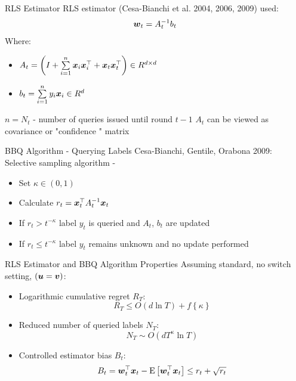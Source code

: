 \documentclass{beamer}
\begin{document}
\begin{frame}{RLS Estimator}
RLS estimator (Cesa-Bianchi et al. 2004, 2006, 2009) used:
\begin{equation*}
{\boldsymbol{w}}_{t}=A_{t}^{-1}b_t
\label{RLS2}
\end{equation*}
Where:\newline
\begin{itemize} 
\item $A_t=\left(I+\sum\limits_{i=1}^{n}{\boldsymbol{x}}_{i} {{\boldsymbol{x}}}^{\top}_{i}+ {\boldsymbol{x}}_{t} {{\boldsymbol{x}}}^{\top}_{t}\right)\in R^{d\times d}$\newline
\item $b_t=\sum\limits_{i=1}^{n}y_i{\boldsymbol{x}}_{i}\in R^d$ \newline
\end{itemize}
 $n=N_t$ - number of queries issued until round $t-1$\newline\newline
$A_t$ can be viewed as covariance or "confidence " matrix
\end{frame}

\begin{frame}{BBQ Algorithm - Querying Labels}
Cesa-Bianchi, Gentile, Orabona 2009:
\newline\newline
Selective sampling algorithm -\newline
\begin{itemize}
\item Set $\kappa\in\left(0,1\right)$\newline
\item Calculate $r_t={{\boldsymbol{x}}}^{\top}_{t}A_{t}^{-1}{\boldsymbol{x}}_{t}$\newline
\item  If $r_t> t^{-\kappa}$ label $y_t$ is queried and $A_t$, $b_t$ are updated\newline
\item If $r_t\leq t^{-\kappa}$  label $y_t$ remains unknown and no update performed
\end{itemize}
\end{frame}

\begin{frame}{RLS Estimator and  BBQ Algorithm Properties}
Assuming standard, no switch setting, $\left({\boldsymbol{u}}={\boldsymbol{v}}\right)$:\newline
\begin{itemize}
\item Logarithmic cumulative regret $R_T$:
\begin{equation*}
 R_T\leq O\left(d\ln{T}\right)+f\left\{\kappa\right\}
\end{equation*}
\item Reduced number of queried labels $N_T$:
\begin{equation*}
N_T\sim O\left(dT^{\kappa}\ln{T}\right)
\end{equation*}
\item Controlled estimator bias $B_t$:
\begin{equation*}
B_t={{\boldsymbol{w}}}^{\top}_{t}{\boldsymbol{x}}_{t}-{\rm E}\left[{{{\boldsymbol{w}}}^{\top}_{t}{\boldsymbol{x}}_{t}}\right]\leq r_t+\sqrt{r_t}
\end{equation*}
\end{itemize} 
\end{frame}
\end{document}
